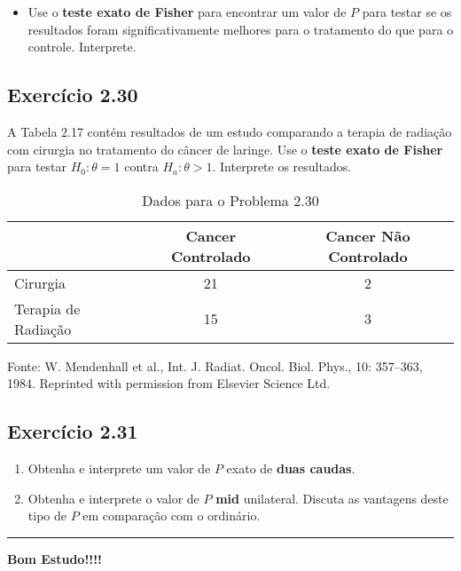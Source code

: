 \documentclass[
]{article}
\providecommand{\tightlist}{%
  \setlength{\itemsep}{0pt}\setlength{\parskip}{0pt}}
\begin{document}
\begin{itemize}
\tightlist
\item
  Use o \textbf{teste exato de Fisher} para encontrar um valor de \(P\)
  para testar se os resultados foram significativamente melhores para o
  tratamento do que para o controle. Interprete.
\end{itemize}

\subsection{Exercício 2.30}\label{exercuxedcio-2.30}

A Tabela 2.17 contém resultados de um estudo comparando a terapia de
radiação com cirurgia no tratamento do câncer de laringe. Use o
\textbf{teste exato de Fisher} para testar \(H_{0}: \theta = 1\) contra
\(H_{a}: \theta > 1\). Interprete os resultados.

\begin{table}[ht]
  \centering
  \caption{Dados para o Problema 2.30}
  \begin{tabular}{lcc}
    \hline
     & Cancer Controlado & Cancer Não Controlado \\
    \hline
    Cirurgia           & 21                & 2                    \\
    Terapia de Radiação & 15               & 3                    \\
    \hline
  \end{tabular}
\end{table}

Fonte: W. Mendenhall et al., Int. J. Radiat. Oncol. Biol. Phys., 10:
357--363, 1984. Reprinted with permission from Elsevier Science Ltd.

\subsection{Exercício 2.31}\label{exercuxedcio-2.31}

\begin{enumerate}
\def\labelenumi{\arabic{enumi}.}
\tightlist
\item
  Obtenha e interprete um valor de \(P\) exato de \textbf{duas caudas}.
\item
  Obtenha e interprete o valor de \(P\) \textbf{mid} unilateral. Discuta
  as vantagens deste tipo de \(P\) em comparação com o ordinário.
\end{enumerate}

\begin{center}\rule{0.5\linewidth}{0.5pt}\end{center}

\textbf{Bom Estudo!!!!}
\end{document}
